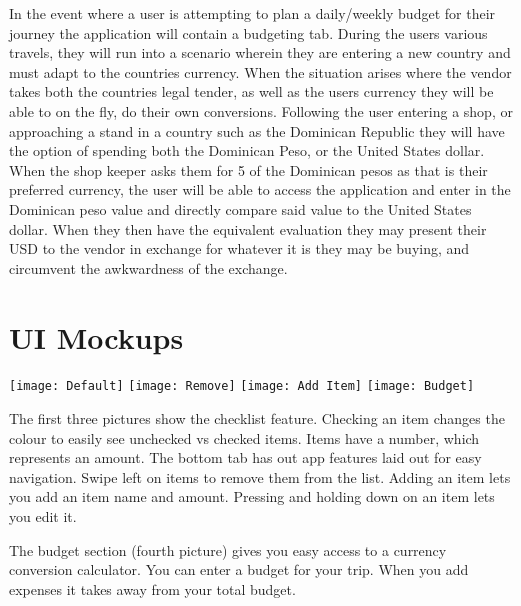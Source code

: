 \documentclass[12pt]{article}
\begin{document}
	In the event where a user is attempting to plan a daily/weekly budget for their journey the application will contain a budgeting tab.
	During the users various travels, they will run into a scenario wherein they are entering a new country and must adapt to the countries currency.
	When the situation arises where the vendor takes both the countries legal tender, as well as the users currency they will be able to on the fly, do their own conversions.
	Following the user entering a shop, or approaching a stand in a country such as the Dominican Republic they will have the option of spending both the Dominican	Peso, or the United States dollar.
	When the shop keeper asks them for 5 of the Dominican pesos as that is their preferred currency, the user will be able to access the application and enter in the Dominican peso value and directly compare said value to the United States dollar.
	When they then have the equivalent evaluation they may present their USD to the vendor in exchange for whatever it is they may be buying, and circumvent the awkwardness of the exchange.
	
\section*{UI Mockups}

    \texttt{[image: Default]} \texttt{[image: Remove]}
    \texttt{[image: Add Item]}   \texttt{[image: Budget]}
    
    The first three pictures show the checklist feature. Checking an item changes the colour to easily see unchecked vs checked items. 
    Items have a number, which represents an amount. 
    The bottom tab has out app features laid out for easy navigation. 
    Swipe left on items to remove them from the list.
    Adding an item lets you add an item name and amount.
    Pressing and holding down on an item lets you edit it.
    
    The budget section (fourth picture) gives you easy access to a currency conversion calculator.
    You can enter a budget for your trip.
    When you add expenses it takes away from your total budget.
\end{document}
